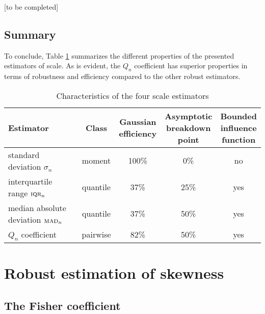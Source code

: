 \alert{[to be completed]}


\subsection{Summary}

To conclude, Table \ref{tab:stat:scale} summarizes the different properties of the
presented estimators of scale. As is evident, the $Q_n$ coefficient has superior
properties in terms of robustness and efficiency compared to the other robust 
estimators.

\begin{table}[h!]
    \centering
    \caption{Characteristics of the four scale estimators}
    \label{tab:stat:scale}
    \begin{tabular}{lcccc}
        \toprule
        Estimator
        & Class  
        & \subtab{c}{Gaussian\\ efficiency}
        & \subtab{c}{Asymptotic\\ breakdown\\ point} 
        & \subtab{c}{Bounded\\ influence\\ function}
        \\\midrule
        standard deviation $\sigma_n$              & moment   & 100\% &  0\% & no
        \\\addlinespace
        interquartile range $\stsc{IQR}_n$       & quantile & 37\%  & 25\% & yes
        \\\addlinespace
        median absolute deviation $\stsc{MAD}_n$ & quantile & 37\%  & 50\% & yes
        \\\addlinespace
        $Q_n$ coefficient                 & pairwise & 82\%  & 50\% & yes
        \\\bottomrule
    \end{tabular}
\end{table}



\section{Robust estimation of skewness}
\label{subsec:skewness}

\subsection{The Fisher coefficient}

